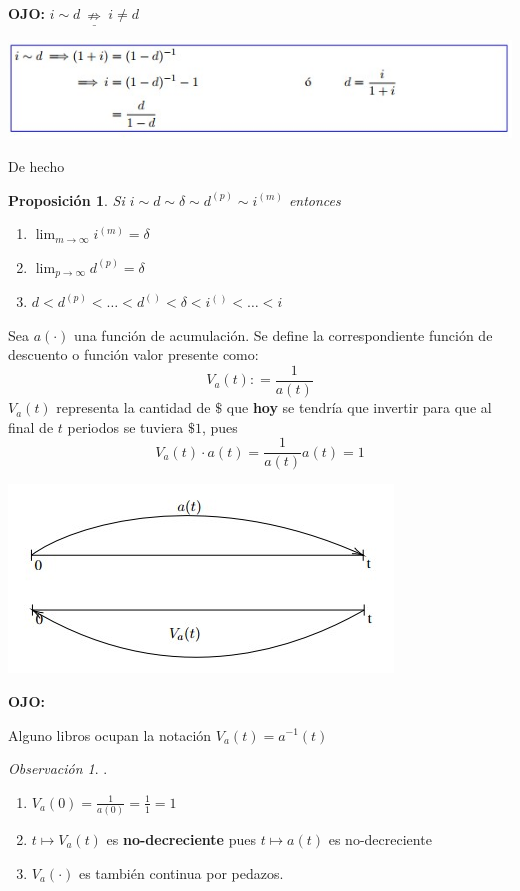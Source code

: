 \documentclass[
]{book}
\newtheorem{proposition}{Proposición}[chapter]
\theoremstyle{definition}
\theoremstyle{definition}
\theoremstyle{definition}
\theoremstyle{definition}
\theoremstyle{remark}
\newtheorem*{remark}{Observación }
\begin{document}
\textbf{OJO:} \(\underline{i \sim d \:\nRightarrow \: i \neq d}\)

\includegraphics{images/14.jpg}

De hecho

\begin{proposition}

Si \(i \sim d \sim \delta \sim d^{(p)} \sim i^{(m)}\) entonces

\begin{enumerate}
\def\labelenumi{\arabic{enumi})}
\item
  \(\lim_{m \to \infty} i^{(m)} = \delta\)
\item
  \(\lim_{p \to \infty} d^{(p)} = \delta\)
\item
  \(d<d^{(p)}< \ldots < d^{()}< \delta < i^{()} < \ldots < i\)
\end{enumerate}

\end{proposition}

Sea \(a(\cdot)\) una función de acumulación. Se define la correspondiente {función de descuento o función valor presente} como:
\[\boxed{V_a(t) : = \frac{1}{a(t)}}\]
\(V_a(t)\) representa la cantidad de \(\$\) que \textbf{hoy} se tendría que invertir para que al final de \(t\) periodos se tuviera \(\$1\), pues
\[V_a(t) \cdot a(t) = \frac{1}{a(t)} a(t) = 1\]

\includegraphics{images/15.jpg}

\textbf{OJO:}

Alguno libros ocupan la notación \(V_a(t) = a^{-1}(t)\)

\begin{remark}

.

\begin{enumerate}
\def\labelenumi{\arabic{enumi})}
\item
  \(V_a(0) = \frac{1}{a(0)} = \frac{1}{1} = 1\)
\item
  \(t \longmapsto V_a(t)\) es \textbf{no-decreciente} pues \(t \longmapsto a(t)\) es no-decreciente
\item
  \(V_a(\cdot)\) es también continua por pedazos.
\end{enumerate}

\end{remark}
\end{document}
